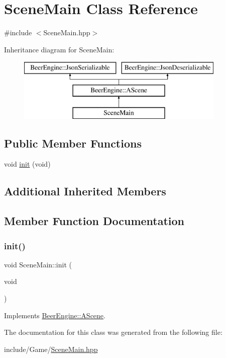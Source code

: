 \hypertarget{class_scene_main}{}\section{Scene\+Main Class Reference}
\label{class_scene_main}


{\ttfamily \#include $<$Scene\+Main.\+hpp$>$}

Inheritance diagram for Scene\+Main\+:\begin{figure}[H]
\begin{center}
\leavevmode
\includegraphics[height=3.000000cm]{class_scene_main}
\end{center}
\end{figure}
\subsection*{Public Member Functions}
\begin{DoxyCompactItemize}
\item 
void \mbox{\hyperlink{class_scene_main_a4406dc5cf9807edcf360ba416de928e2}{init}} (void)
\end{DoxyCompactItemize}
\subsection*{Additional Inherited Members}


\subsection{Member Function Documentation}
\mbox{\label{class_scene_main_a4406dc5cf9807edcf360ba416de928e2}} 
\subsubsection{\texorpdfstring{init()}{init()}}
{\footnotesize\ttfamily void Scene\+Main\+::init (\begin{DoxyParamCaption}\item[{void}]{ }\end{DoxyParamCaption})\hspace{0.3cm}{\ttfamily [virtual]}}



Implements \mbox{\hyperlink{class_beer_engine_1_1_a_scene_a7a55b4e506ae618e6596ae812ad48db0}{Beer\+Engine\+::\+A\+Scene}}.



The documentation for this class was generated from the following file\+:\begin{DoxyCompactItemize}
\item 
include/\+Game/\mbox{\hyperlink{_scene_main_8hpp}{Scene\+Main.\+hpp}}\end{DoxyCompactItemize}
